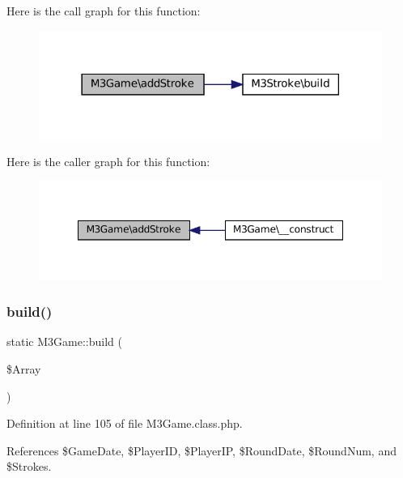 Here is the call graph for this function\+:\nopagebreak
\begin{figure}[H]
\begin{center}
\leavevmode
\includegraphics[width=318pt]{class_m3_game_a67cf9e1f6628972901cfd6667dd2d453_cgraph}
\end{center}
\end{figure}
Here is the caller graph for this function\+:\nopagebreak
\begin{figure}[H]
\begin{center}
\leavevmode
\includegraphics[width=348pt]{class_m3_game_a67cf9e1f6628972901cfd6667dd2d453_icgraph}
\end{center}
\end{figure}
\mbox{\label{class_m3_game_a14b38fdf7f73b3947f039fd8e6fc2cce}} 
\subsubsection{\texorpdfstring{build()}{build()}}
{\footnotesize\ttfamily static M3\+Game\+::build (\begin{DoxyParamCaption}\item[{}]{\$\+Array }\end{DoxyParamCaption})\hspace{0.3cm}{\ttfamily [static]}}



Definition at line 105 of file M3\+Game.\+class.\+php.



References \$\+Game\+Date, \$\+Player\+ID, \$\+Player\+IP, \$\+Round\+Date, \$\+Round\+Num, and \$\+Strokes.



